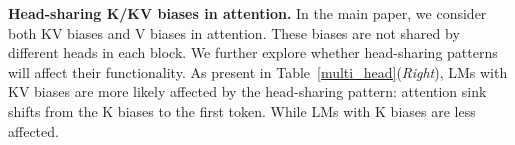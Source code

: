 


\textbf{Head-sharing K/KV biases in attention.} In the main paper, we consider both KV biases and V biases in attention. These biases are not shared by different heads in each block. We further explore whether head-sharing patterns will affect their functionality. As present in Table~\ref{multi_head}(\emph{Right}), LMs with KV biases are more likely affected by the head-sharing pattern: attention sink shifts from the K biases to the first token. While LMs with K biases are less affected. 

